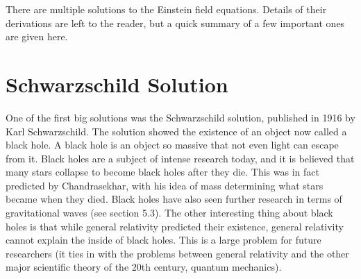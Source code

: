 There are multiple solutions to the Einstein field equations. Details of their derivations are left to the reader, but a quick summary of a few important ones are given here.
\section{Schwarzschild Solution}
One of the first big solutions was the Schwarzschild solution, published in 1916 by Karl Schwarzschild. The solution showed the existence of an object
now called a black hole. A black hole is an object so massive that not even light can escape from it. Black holes are a subject of intense research today,
and it is believed that many stars collapse to become black holes after they die. This was in fact predicted by Chandrasekhar, with his idea of mass
determining what stars became when they died. Black holes have also seen further research in terms of gravitational waves (see section 5.3). 
The other interesting thing about black holes is that while general relativity predicted their existence, general relativity cannot explain the inside
of black holes. This is a large problem for future researchers (it ties in with the problems between general relativity and the other major
scientific theory of the 20th century, quantum mechanics). 
